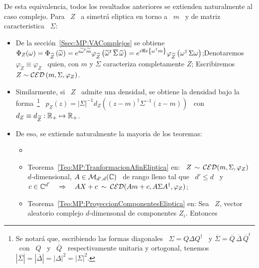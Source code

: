 De esta equivalencia, todos  los resultados anteriores se extienden naturalmente
al caso  complejo. Para \ $Z$ \  a simetr\'a eliptica en  torno a \ $m$  \ y de
matriz caracteristica \ $\Sigma$:
%
\begin{itemize}
\item  De la  secci\'on~\ref{Ssec:MP:VAComplejos} se  obtiene  $\Phi_Z(\omega) =
  \Phi_{\widetilde{Z}}\left(    \widetilde{\omega}     \right)    =    e^{\imath
    \widetilde{\omega}^t       \widetilde{m}}      \varphi_{\widetilde{Z}}\left(
    \widetilde{\omega}^t  \, \overline{\Sigma}  \, \widetilde{\omega}  \right) =
  e^{\imath  \Re e \left\{ \omega^\dag m \right\}} \varphi_{\widetilde{Z}}\left(  \omega^\dag \,
    \Sigma \omega  \right)$;\newline Denotaremos $\varphi_{\widetilde{Z}} \equiv
  \varphi_Z$ \ quien, con  $m$ y $\Sigma$ caracteriza completamente $Z$;\newline
  Escribiremos $Z \sim \mathcal{CED}\left( m , \Sigma , \varphi_Z \right)$.
%
\item Similarmente, si \ $Z$ \  admite una densidad, se obtiene la densidad bajo
  la  forma~\footnote{Se  notar\'a  que,  escribiendo las  formas  diagonales  \
    $\Sigma  =  Q  \Delta  Q^\dag$  \ y  $\overline{\Sigma}  =  \overline{Q}  \,
    \overline{\Delta}  \, \overline{Q}^t$ \  con \  $Q$ \  y \  $\overline{Q}$ \
    respectivamente  unitaria y ortogonal,  tenemos \  $\left| \overline{\Sigma}
    \right|  = \left|  \overline{\Delta}  \right| =  \left|  \Delta \right|^2  =
    \left| \Sigma  \right|^2$.}  \ $p_Z(z) =  |\Sigma|^{-1} d_Z\left( (z-m)^\dag
    \Sigma^{-1} (z-m)  \right)$ \ con  \ $d_Z \equiv  d_{\widetilde{Z}}: \mathbb{R}_+
  \mapsto \mathbb{R}_+$.
%
\item  De eso,  se extiende  naturalmente la mayoria de los teoremas:
%
  \begin{itemize}
  \item  {}~\cite{Kri76}
  \item  Teorema~\ref{Teo:MP:TranformacionAfinEliptica}  en:  \  $Z \,  \sim  \,
    \mathcal{CED}(m,\Sigma,\varphi_Z)$ \  $d$-dimensional, $A \in  \mathcal{M}_{d',d}(\mathbb{C})$ \ de
    rango lleno tal que  \ $d' \le d$ \ y \  $c \in \mathbb{C}^{d'} \quad \Rightarrow
    \quad A X + c \: \sim \: \mathcal{CED}(A m + c , A \Sigma A^\dag , \varphi_Z)$;
  \item Teorema~\ref{Teo:MP:ProyeccionComponentesEliptica} en: Sea \ $Z$, vector
    aleatorio   complejo   $d$-dimensonal   de   componentes   $Z_i$.   Entonces

\end{itemize}
\end{itemize}
